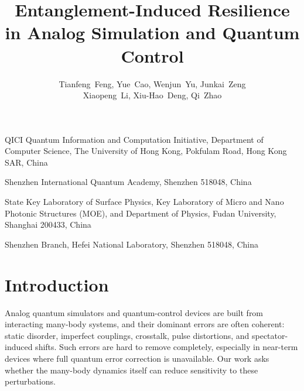 \documentclass[a4paper]{article}
\begin{document}
\title{
Entanglement-Induced Resilience in Analog Simulation and Quantum Control
}

\author{
Tianfeng~Feng,
Yue~Cao,
Wenjun~Yu,
Junkai~Zeng\\
Xiaopeng~Li,
Xiu-Hao~Deng,
Qi~Zhao
}

\address{1}{
QICI Quantum Information and Computation Initiative, Department of Computer Science,
The University of Hong Kong, Pokfulam Road, Hong Kong SAR, China
}
\address{2}{
Shenzhen International Quantum Academy, Shenzhen 518048, China
}
\address{3}{
State Key Laboratory of Surface Physics, Key Laboratory of Micro and Nano
Photonic Structures (MOE), and Department of Physics, Fudan University,
Shanghai 200433, China
}
\address{4}{
Shenzhen Branch, Hefei National Laboratory, Shenzhen 518048, China
}



\maketitle

\section{Introduction}

Analog quantum simulators and quantum-control devices are built from
interacting many-body systems, and their dominant errors are often coherent:
static disorder, imperfect couplings, crosstalk, pulse distortions, and
spectator-induced shifts. Such errors are hard to remove completely, especially
in near-term devices where full quantum error correction is unavailable. Our
work asks whether the many-body dynamics itself can reduce sensitivity to
these perturbations.
\end{document}
